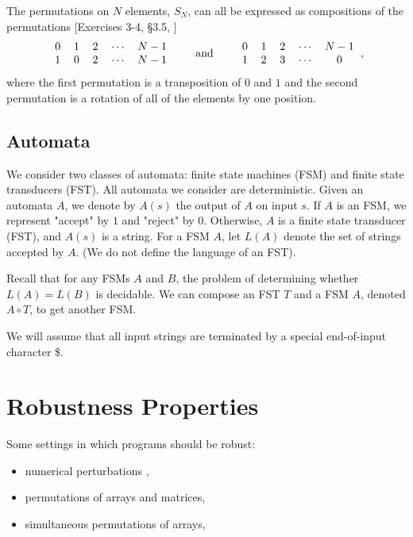 \documentclass{llncs}
\begin{document}
\makeatletter
\renewcommand{\@cite}[1]{#1}
\makeatother
The permutations on \(N\) elements, \(S_{N}\), can all be expressed as compositions of the permutations [Exercises 3-4, \S3.5, \cite{dummitfoote}]
\[\begin{tabular}{ccccc}
0 & 1 & 2 & \(\dotsm\) & \(N-1\)\\
1 & 0 & 2 & \(\dotsm\) & \(N-1\)
\end{tabular}
\qquad\textrm{and}\qquad
\begin{tabular}{ccccc}
0 & 1 & 2 & \(\dotsm\) & \(N-1\)\\
1 & 2 & 3 & \(\dotsm\) & 0
\end{tabular},\]
\makeatletter
\renewcommand{\@cite}[1]{[#1]}
\makeatother
where the first permutation is a transposition of \(0\) and \(1\) and the second permutation is a rotation of all of the elements by one position.

\subsection{Automata}
We consider two classes of automata: finite state machines (FSM) and finite state transducers (FST). All automata we consider are deterministic. Given an automata $A$, we denote by $A(s)$ the output of $A$ on input $s$. If $A$ is an FSM, we represent "accept" by $1$ and "reject" by $0$. Otherwise, $A$ is a finite state transducer (FST), and $A(s)$ is a string. For a FSM $A$, let $L(A)$ denote the set of strings accepted by $A$. (We do not define the language of an FST).

Recall that for any FSMs $A$ and $B$, the problem of determining whether $L(A) = L(B)$ is decidable. We can compose an FST $T$ and a FSM $A$, denoted $A \circ T$, to get another FSM.

We will assume that all input strings are terminated by a special end-of-input character \$.

\section{Robustness Properties}

Some settings in which programs should be robust:
\begin{itemize}
\item numerical perturbations \cite{samanta14,chaudhuri10,chaudhuri11},
\item permutations of arrays and matrices,
\item simultaneous permutations of arrays,
\end{itemize}
\end{document}
